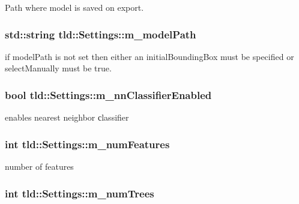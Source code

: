 Path where model is saved on export. 

\hypertarget{classtld_1_1Settings_ac09a844a6ee9727f04e2de086f4fa9ce}{
\subsubsection[{m\-\_\-model\-Path}]{\setlength{\rightskip}{0pt plus 5cm}std\-::string tld\-::\-Settings\-::m\-\_\-model\-Path}}\label{classtld_1_1Settings_ac09a844a6ee9727f04e2de086f4fa9ce}


if model\-Path is not set then either an initial\-Bounding\-Box must be specified or select\-Manually must be true. 

\hypertarget{classtld_1_1Settings_a8ec793b6668a626308d8ee8d697d9f67}{
\subsubsection[{m\-\_\-nn\-Classifier\-Enabled}]{\setlength{\rightskip}{0pt plus 5cm}bool tld\-::\-Settings\-::m\-\_\-nn\-Classifier\-Enabled}}\label{classtld_1_1Settings_a8ec793b6668a626308d8ee8d697d9f67}


enables nearest neighbor сlassifier 

\hypertarget{classtld_1_1Settings_af15afe9f4ffb32e89686c8e90026e2bc}{
\subsubsection[{m\-\_\-num\-Features}]{\setlength{\rightskip}{0pt plus 5cm}int tld\-::\-Settings\-::m\-\_\-num\-Features}}\label{classtld_1_1Settings_af15afe9f4ffb32e89686c8e90026e2bc}


number of features 

\hypertarget{classtld_1_1Settings_a959d793b002e13f6758fc84765b7d33d}{
\subsubsection[{m\-\_\-num\-Trees}]{\setlength{\rightskip}{0pt plus 5cm}int tld\-::\-Settings\-::m\-\_\-num\-Trees}}\label{classtld_1_1Settings_a959d793b002e13f6758fc84765b7d33d}


